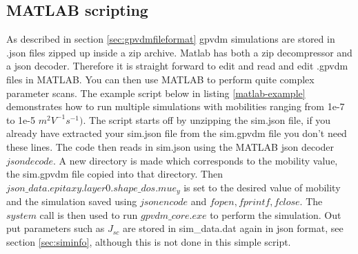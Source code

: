 \newpage
\subsection{MATLAB scripting}
\label{sec:matlabscripts}
As described in section \ref{sec:gpvdmfileformat} gpvdm simulations are stored in .json files zipped up inside a zip archive. Matlab has both a zip decompressor and a json decoder.  Therefore it is straight forward to edit and read and edit .gpvdm files in MATLAB. You can then use MATLAB to perform quite complex parameter scans.  The example script below in listing \ref{matlab-example} demonstrates how to run multiple simulations with mobilities ranging from 1e-7 to 1e-5 $m^{2}V^{-1}s^{-1})$. The script starts off by unzipping the sim.json file, if you already have extracted your sim.json file from the sim.gpvdm file you don't need these lines. The code then reads in sim.json using the MATLAB json decoder $jsondecode$. A new directory is made which corresponds to the mobility value, the sim.gpvdm file copied into that directory. Then $json\_data.epitaxy.layer0.shape\_dos.mue_y$ is set to the desired value of mobility and the simulation saved using $jsonencode$ and $fopen,fprintf,fclose$.  The $system$ call is then used to run $gpvdm\_core.exe$ to perform the simulation. Out put parameters such as $J_{sc}$ are stored in sim\_data.dat again in json format, see section \ref{sec:siminfo}, although this is not done in this simple script.



